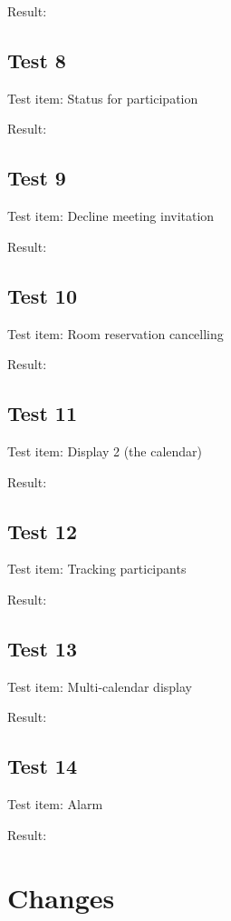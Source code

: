 Result:

\subsection{Test 8}
Test item: Status for participation

Result:

\subsection{Test 9}
Test item: Decline meeting invitation

Result:

\subsection{Test 10}
Test item: Room reservation cancelling

Result:

\subsection{Test 11}
Test item: Display 2 (the calendar)

Result:

\subsection{Test 12}
Test item: Tracking participants

Result:

\subsection{Test 13}
Test item: Multi-calendar display

Result:

\subsection{Test 14}
Test item: Alarm

Result:
\section{Changes}

